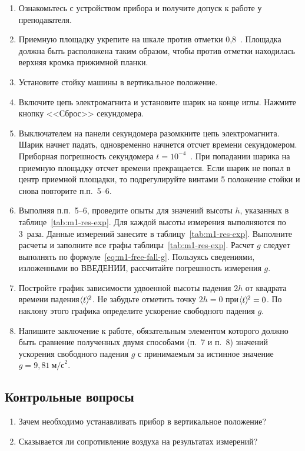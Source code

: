 \documentclass[a4paper, 12pt]{extarticle}
\begin{document}
\begin{enumerate}
\item Ознакомьтесь с устройством прибора и получите допуск к работе у преподавателя. 
\item Приемную площадку укрепите на шкале против отметки 0,8~. Площадка должна быть расположена таким образом, чтобы против отметки находилась верхняя кромка прижимной планки. %
\item Установите стойку машины в вертикальное положение.
\item Включите цепь электромагнита и установите шарик на конце иглы. Нажмите кнопку <<Сброс>> секундомера.
\item Выключателем на панели секундомера разомкните цепь электромагнита. Шарик начнет падать, одновременно начнется отсчет времени секундомером. Приборная погрешность секундомера $t = 10^{-4}$~. При попадании шарика на приемную площадку отсчет времени прекращается. Если шарик не попал в центр приемной площадки, то подрегулируйте винтами 5 положение стойки и снова повторите п.п.~5--6. %
\item Выполняя п.п.~5--6, проведите опыты для значений высоты $h$, указанных в таблице~\ref{tab:m1-res-exp}. Для каждой высоты измерения выполняются по 3~раза. Данные измерений занесите в таблицу~\ref{tab:m1-res-exp}.  Выполните расчеты и заполните все графы таблицы~\ref{tab:m1-res-exp}. Расчет $g$ следует выполнять по формуле~\eqref{eq:m1-free-fall-g}. Пользуясь сведениями, изложенными во ВВЕДЕНИИ, рассчитайте погрешность измерения $g$. %
\item Постройте график зависимости удвоенной высоты падения $2h$ от квадрата времени падения $\hspace{-3pt}\left<t\right>\hspace{-3pt}^2$. Не забудьте отметить точку $2h = 0$ при $\hspace{-3pt}\left<t\right>\hspace{-3pt}^2 = 0$. По наклону этого графика определите ускорение свободного падения $g$.
\item Напишите заключение к работе, обязательным элементом которого должно быть сравнение полученных двумя способами (п.~7 и п.~8) значений ускорения свободного падения $g$ с принимаемым за истинное значение $g = 9,81\   \text{м/с}^2$. %
\end{enumerate}

\subsection{Контрольные вопросы}
\begin{enumerate}
\item Зачем необходимо устанавливать прибор в вертикальное положение?
\item Сказывается ли сопротивление воздуха на результатах измерений?
\end{enumerate}
\end{document}
